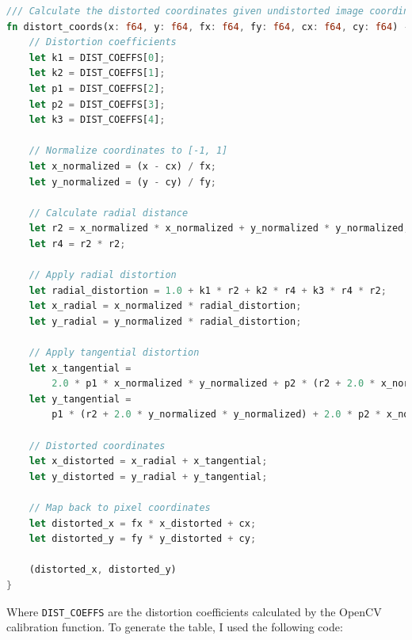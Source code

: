 \begin{lstlisting}[language=rust,breaklines,label={lst:distort_coords}]
/// Calculate the distorted coordinates given undistorted image coordinates.
fn distort_coords(x: f64, y: f64, fx: f64, fy: f64, cx: f64, cy: f64) -> (f64, f64) {
    // Distortion coefficients
    let k1 = DIST_COEFFS[0];
    let k2 = DIST_COEFFS[1];
    let p1 = DIST_COEFFS[2];
    let p2 = DIST_COEFFS[3];
    let k3 = DIST_COEFFS[4];

    // Normalize coordinates to [-1, 1]
    let x_normalized = (x - cx) / fx;
    let y_normalized = (y - cy) / fy;

    // Calculate radial distance
    let r2 = x_normalized * x_normalized + y_normalized * y_normalized;
    let r4 = r2 * r2;

    // Apply radial distortion
    let radial_distortion = 1.0 + k1 * r2 + k2 * r4 + k3 * r4 * r2;
    let x_radial = x_normalized * radial_distortion;
    let y_radial = y_normalized * radial_distortion;

    // Apply tangential distortion
    let x_tangential =
        2.0 * p1 * x_normalized * y_normalized + p2 * (r2 + 2.0 * x_normalized * x_normalized);
    let y_tangential =
        p1 * (r2 + 2.0 * y_normalized * y_normalized) + 2.0 * p2 * x_normalized * y_normalized;

    // Distorted coordinates
    let x_distorted = x_radial + x_tangential;
    let y_distorted = y_radial + y_tangential;

    // Map back to pixel coordinates
    let distorted_x = fx * x_distorted + cx;
    let distorted_y = fy * y_distorted + cy;

    (distorted_x, distorted_y)
}
\end{lstlisting}
Where \texttt{DIST\_COEFFS} are the distortion coefficients calculated by the OpenCV calibration function.
To generate the table, I used the following code:
